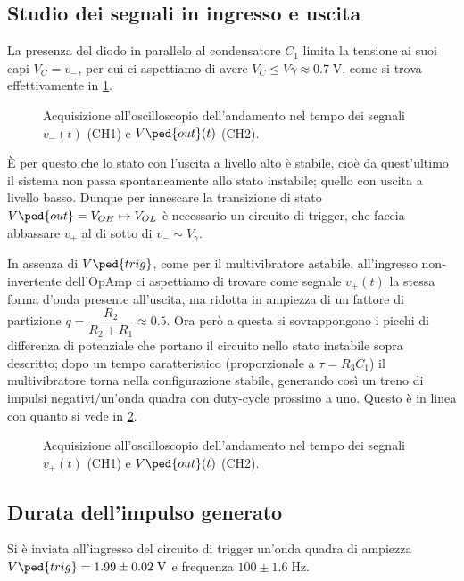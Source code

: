 \documentclass[10pt, a4paper, italian]{article}
\begin{document}
\subsection{Studio dei segnali in ingresso e uscita}
La presenza del diodo in parallelo al condensatore $C_1$ limita la tensione
ai suoi capi $V_C = v_-$, per cui ci aspettiamo di avere
$V_C \leq V\gamma \approx 0.7 \; \si{\V}$, come si trova effettivamente in
\cref{fig: mstabilev-}.
\begin{figure}[htbp]
	\centering
	\caption{Acquisizione all'oscilloscopio dell'andamento nel tempo dei
	segnali $v_- (t)$ (CH1) e $V\ped{out} (t)$ (CH2). \label{fig: mstabilev-}}
\end{figure}

\`E per questo che lo stato con l'uscita a livello alto è stabile,
cioè da quest'ultimo il sistema non passa spontaneamente allo stato instabile;
quello con uscita a livello basso.
Dunque per innescare la transizione di stato
$V\ped{out} = V_{OH} \mapsto V_{OL}$ è necessario un circuito di trigger,
che faccia abbassare $v_+$ al di sotto di $v_- \sim V_\gamma$.

In assenza di $V\ped{trig}$, come per il multivibratore astabile, all'ingresso
non-invertente dell'OpAmp ci aspettiamo di trovare come segnale $v_+ (t)$ la
stessa forma d'onda presente all'uscita, ma ridotta in ampiezza di un fattore di partizione $q = \dfrac{R_2}{R_2 + R_1} \approx 0.5$.
Ora però a questa si sovrappongono i picchi di differenza di potenziale che
portano il circuito nello stato instabile sopra descritto; dopo un tempo
caratteristico (proporzionale a $\tau = R_3 C_1$) il multivibratore torna
nella configurazione stabile, generando così un treno di impulsi
negativi/un'onda quadra con duty-cycle prossimo a uno.
Questo è in linea con quanto si vede in \cref{fig: mstabilev+}.
\begin{figure}[htbp]
	\centering
	\caption{Acquisizione all'oscilloscopio dell'andamento nel tempo dei
	segnali $v_+ (t)$ (CH1) e $V\ped{out} (t)$ (CH2). \label{fig: mstabilev+}}
\end{figure}

\subsection{Durata dell'impulso generato}
Si è inviata all'ingresso del circuito di trigger un'onda quadra di ampiezza
$V\ped{trig} = 1.99 \pm 0.02 \; \si{\V}$ e frequenza $100 \pm 1.6 \; \si{\Hz}$.
\end{document}
